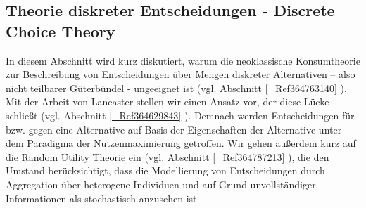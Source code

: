 \subsection{Theorie diskreter Entscheidungen - Discrete Choice Theory}
\label{_Ref364762759}
\label{_Toc366766077}
\label{_Toc366775271}
\label{_Toc363572019}
\label{_Ref363585179}
\label{_Toc363601734}
In diesem Abschnitt wird kurz diskutiert, warum die neoklassische Konsumtheorie zur Beschreibung von Entscheidungen über Mengen diskreter Alternativen – also nicht teilbarer Güterbündel - ungeeignet ist (vgl. Abschnitt \autoref{_Ref364763140} ). Mit der Arbeit von Lancaster stellen wir einen Ansatz vor, der diese Lücke schließt (vgl. Abschnitt \autoref{_Ref364629843} ). Demnach werden Entscheidungen für bzw. gegen eine Alternative auf Basis der Eigenschaften der Alternative unter dem Paradigma der Nutzenmaximierung getroffen. Wir gehen außerdem kurz auf die Random Utility Theorie ein (vgl. Abschnitt \autoref{_Ref364787213} ), die den Umstand berücksichtigt, dass die Modellierung von Entscheidungen durch Aggregation über heterogene Individuen und auf Grund unvollständiger Informationen als stochastisch anzusehen ist.
%
